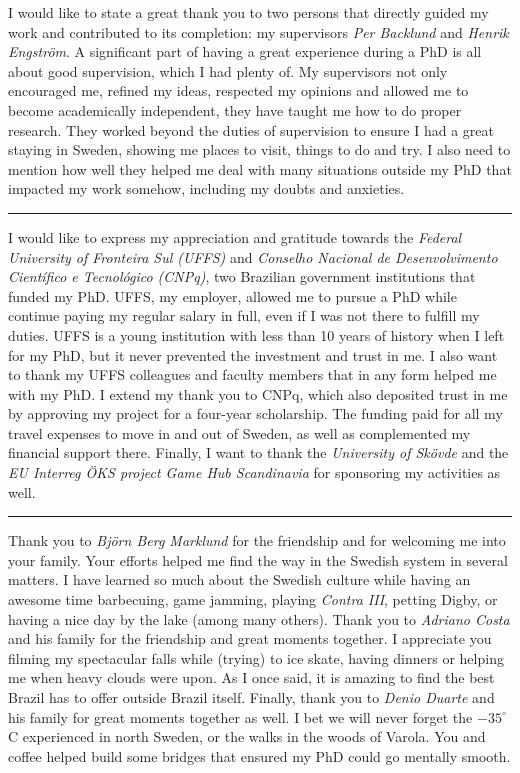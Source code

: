 I would like to state a great thank you to two persons that directly guided my work and contributed to its completion: my supervisors \textit{Per Backlund} and \textit{Henrik Engstr{\"o}m}. A significant part of having a great experience during a PhD is all about good supervision, which I had plenty of. My supervisors not only encouraged me, refined my ideas, respected my opinions and allowed me to become academically independent, they have taught me how to do proper research. They worked beyond the duties of supervision to ensure I had a great staying in Sweden, showing me places to visit, things to do and try. I also need to mention how well they helped me deal with many situations outside my PhD that impacted my work somehow, including my doubts and anxieties.

\vspace{7pt}\hrule\vspace{5pt}

I would like to express my appreciation and gratitude towards the \textit{Federal University of Fronteira Sul (UFFS)} and \textit{Conselho Nacional de Desenvolvimento Cient\'{i}fico e Tecnol\'{o}gico (CNPq)}, two Brazilian government institutions that funded my PhD. UFFS, my employer, allowed me to pursue a PhD while continue paying my regular salary in full, even if I was not there to fulfill my duties. UFFS is a young institution with less than 10 years of history when I left for my PhD, but it never prevented the investment and trust in me. I also want to thank my UFFS colleagues and faculty members that in any form helped me with my PhD. I extend my thank you to CNPq, which also deposited trust in me by approving my project for a four-year scholarship. The funding paid for all my travel expenses to move in and out of Sweden, as well as complemented my financial support there. Finally, I want to thank the \textit{University of Sk\"ovde} and the \textit{EU Interreg \"OKS project Game Hub Scandinavia} for sponsoring my activities as well.

\vspace{7pt}\hrule\vspace{5pt}

Thank you to \textit{Bj{\"o}rn Berg Marklund} for the friendship and for welcoming me into your family. Your efforts helped me find the way in the Swedish system in several matters. I have learned so much about the Swedish culture while having an awesome time barbecuing, game jamming, playing \textit{Contra III}, petting Digby, or having a nice day by the lake (among many others). Thank you to \textit{Adriano Costa} and his family for the friendship and great moments together. I appreciate you filming my spectacular falls while (trying) to ice skate, having dinners or helping me when heavy clouds were upon. As I once said, it is amazing to find the best Brazil has to offer outside Brazil itself. Finally, thank you to \textit{Denio Duarte} and his family for great moments together as well. I bet we will never forget the $-35^{\circ}$C experienced in north Sweden, or the walks in the woods of Varola. You and coffee helped build some bridges that ensured my PhD could go mentally smooth.

